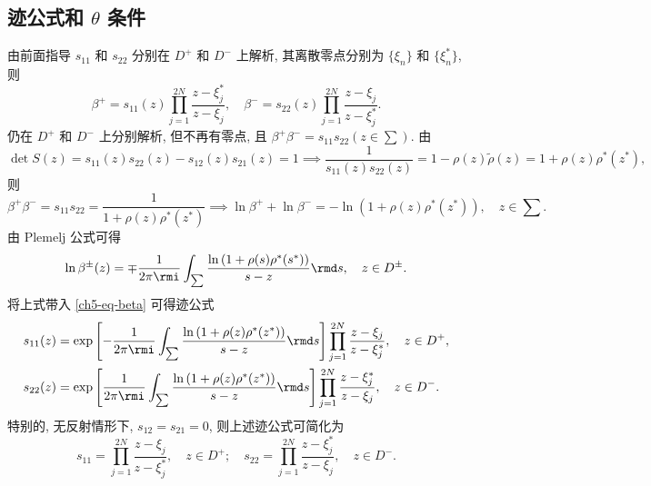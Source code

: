 \subsection{迹公式和 $\theta$ 条件}
由前面指导 $s_{11}$ 和 $s_{22}$ 分别在 $D^{+}$ 和 $D^{-}$ 上解析, 其离散零点分别为 $ \{\xi_{n}\} $ 和 $ \{\xi_{n}^{*}\} $, 则
\begin{equation}
    \beta^{+} = s_{11}(z) \prod_{j=1}^{2N} \frac{z - \xi_{j}^{*}}{z - \xi_{j}}, \quad \beta^{-} = s_{22}(z) \prod_{j=1}^{2N} \frac{z - \xi_{j}}{z - \xi_{j}^{*}}.
    \label{ch5-eq-beta}
\end{equation}
仍在 $D^{+}$ 和 $D^{-}$ 上分别解析, 但不再有零点, 且 $\beta^{+} \beta^{-} = s_{11} s_{22} (z \in \sum)$. 由
\begin{equation}
    \det{S(z)} = s_{11}(z) s_{22}(z) - s_{12}(z) s_{21}(z) = 1 \implies \frac{1}{s_{11}(z) s_{22}(z)} = 1 - \rho(z) \tilde{\rho}(z) = 1 + \rho(z) \rho^{*}(z^{*}),
\end{equation}
则
\begin{equation}
    \beta^{+} \beta^{-} = s_{11} s_{22} = \frac{1}{1 + \rho(z) \rho^{*}(z^{*})} \implies \ln{\beta^{+}} + \ln{\beta^{-}} = - \ln{(1 + \rho(z) \rho^{*}(z^{*}))}, \quad z \in \sum.
    \label{ch5-eq-beta-jump}
\end{equation}
由 Plemelj 公式可得
\begin{equation}
    \ln{\beta^{\pm}(z)} = \mp \frac{1}{2\pi \rmi} \int_{\sum} \frac{\ln{(1 + \rho(s) \rho^{*}(s^{*}))}}{s - z} \rmd s, \quad z \in D^{\pm}.
    \label{ch5-eq-beta-plemelj}
\end{equation}
将上式带入 \eqref{ch5-eq-beta} 可得迹公式
\begin{align}
    s_{11}(z) & = \exp{\left[ - \frac{1}{2 \pi \rmi} \int_{\sum} \frac{\ln{(1+\rho(z) \rho^{*}(z^{*}))}}{s-z} \rmd s \right]} \prod_{j=1}^{2N} \frac{z - \xi_{j}}{z - \xi_{j}^{*}}, \quad z \in D^{+}, \label{ch5-eq-trace-s11} \\
    s_{22}(z) & = \exp{\left[ \frac{1}{2 \pi \rmi} \int_{\sum} \frac{\ln{(1+\rho(z) \rho^{*}(z^{*}))}}{s-z} \rmd s \right]} \prod_{j=1}^{2N} \frac{z - \xi_{j}^{*}}{z - \xi_{j}}, \quad z \in D^{-}.
    \label{ch5-eq-trace-s22}
\end{align}
特别的, 无反射情形下, $s_{12} = s_{21} = 0$, 则上述迹公式可简化为
\begin{equation}
    s_{11} = \prod_{j=1}^{2N} \frac{z - \xi_{j}}{z - \xi_{j}^{*}}, \quad z \in D^{+}; \quad s_{22} = \prod_{j=1}^{2N} \frac{z - \xi_{j}^{*}}{z - \xi_{j}}, \quad z \in D^{-}.
\end{equation}
